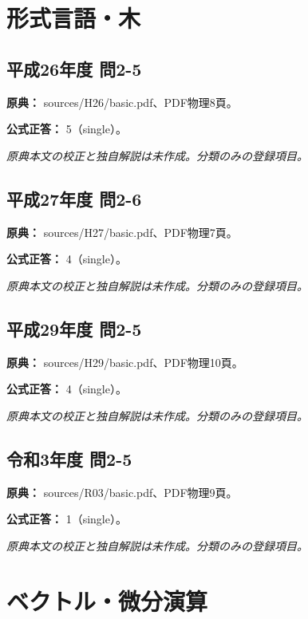 \section{形式言語・木}

\subsection{平成26年度 問2-5}
\label{q:h26-reg-basic-2-5}

\noindent\textbf{原典：} sources/H26/basic.pdf、PDF物理8頁。

\textbf{公式正答：} 5（single）。

\par\textit{原典本文の校正と独自解説は未作成。分類のみの登録項目。}

\subsection{平成27年度 問2-6}
\label{q:h27-reg-basic-2-6}

\noindent\textbf{原典：} sources/H27/basic.pdf、PDF物理7頁。

\textbf{公式正答：} 4（single）。

\par\textit{原典本文の校正と独自解説は未作成。分類のみの登録項目。}

\subsection{平成29年度 問2-5}
\label{q:h29-reg-basic-2-5}

\noindent\textbf{原典：} sources/H29/basic.pdf、PDF物理10頁。

\textbf{公式正答：} 4（single）。

\par\textit{原典本文の校正と独自解説は未作成。分類のみの登録項目。}

\subsection{令和3年度 問2-5}
\label{q:r03-reg-basic-2-5}

\noindent\textbf{原典：} sources/R03/basic.pdf、PDF物理9頁。

\textbf{公式正答：} 1（single）。

\par\textit{原典本文の校正と独自解説は未作成。分類のみの登録項目。}

\section{ベクトル・微分演算}

